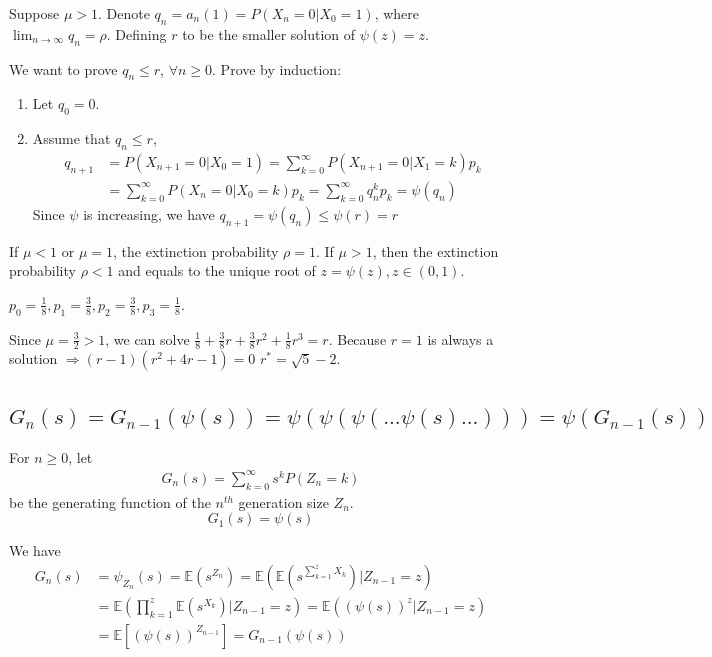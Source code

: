 \documentclass[11pt]{elegantbook}
\begin{document}
Suppose $\mu>1$. Denote $q_n=a_n(1)=P(X_n=0|X_0=1)$, where $\lim_{n \rightarrow \infty}q_n=\rho$. Defining $r$ to be the smaller solution of $\psi(z)=z$.

We want to prove $q_n\leq r$, $\forall n\geq 0$. Prove by induction:
\begin{enumerate}
    \item Let $q_0=0$.
    \item Assume that $q_n\leq r$,
    \begin{equation}
        \begin{aligned}
            q_{n+1}&=P(X_{n+1}=0|X_0=1)=\sum_{k=0}^\infty P(X_{n+1}=0|X_1=k)p_k\\&=\sum_{k=0}^\infty P(X_{n}=0|X_0=k)p_k=\sum_{k=0}^\infty q_n^k p_k=\psi(q_n)
        \end{aligned}
        \nonumber
    \end{equation}
    Since $\psi$ is increasing, we have $q_{n+1}=\psi(q_n)\leq \psi(r)=r$
\end{enumerate}

\begin{theorem}
    If $\mu<1$ or $\mu=1$, the extinction probability $\rho=1$. If $\mu>1$, then the extinction probability $\rho<1$ and equals to the unique root of $z=\psi(z),z\in (0,1)$.
\end{theorem}

\begin{example}
    $p_0=\frac{1}{8},p_1=\frac{3}{8},p_2=\frac{3}{8},p_3=\frac{1}{8}$.
\end{example}
Since $\mu=\frac{3}{2}>1$, we can solve $\frac{1}{8}+\frac{3}{8}r+\frac{3}{8}r^2+\frac{1}{8}r^3=r$. Because $r=1$ is always a solution $\Rightarrow (r-1)(r^2+4r-1)=0$ $r^*=\sqrt{5}-2$.

\subsection{$G_n(s)=G_{n-1}(\psi(s))=\psi(\psi(\psi(...\psi(s)...)))=\psi(G_{n-1}(s))$}
For $n\geq 0$, let
\begin{equation}
    \begin{aligned}
        G_n(s)=\sum_{k=0}^\infty s^k P(Z_n=k)
    \end{aligned}
    \nonumber
\end{equation}
be the generating function of the $n^{th}$ generation size $Z_n$. $$G_1(s)=\psi(s)$$

We have
\begin{equation}
    \begin{aligned}
        G_n(s)&=\psi_{Z_n}(s)=\mathbb{E}(s^{Z_n})= \mathbb{E}\left(\mathbb{E}(s^{\sum_{k=1}^{z}X_k})|Z_{n-1}=z\right)\\
        &=\mathbb{E}\left(\prod_{k=1}^{z}\mathbb{E}(s^{X_k})|Z_{n-1}=z\right)=\mathbb{E}\left((\psi(s))^{z}|Z_{n-1}=z\right)\\
        &=\mathbb{E}\left[(\psi(s))^{Z_{n-1}}\right]=G_{n-1}(\psi(s))
    \end{aligned}
    \nonumber
\end{equation}
\end{document}
